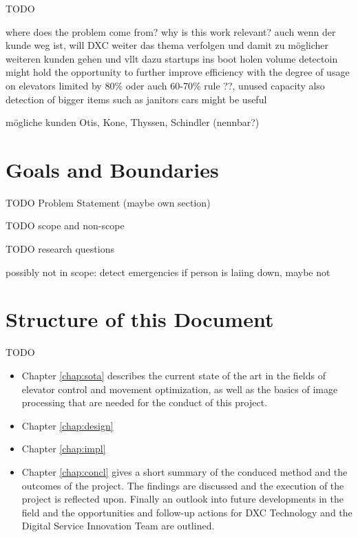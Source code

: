 TODO


where does the problem come from?
why is this work relevant?
auch wenn der kunde weg ist, will DXC weiter das thema verfolgen und damit zu möglicher weiteren kunden gehen und vllt dazu startups ins boot holen
volume detectoin might hold the opportunity to further improve efficiency with the degree of usage on elevators
limited by 80\% oder auch 60-70\% rule ??, unused capacity
also detection of bigger items such as janitors cars might be useful


mögliche kunden Otis, Kone, Thyssen, Schindler (nennbar?)

\section{Goals and Boundaries}

TODO Problem Statement (maybe own section)

TODO scope and non-scope

TODO research questions

possibly not in scope: detect emergencies if person is laiing down, maybe not


\section{Structure of this Document}

TODO

\begin{itemize}
    \item Chapter \ref{chap:sota} describes the current state of the art in the fields of elevator control and movement optimization, as well as the basics of image processing that are needed for the conduct of this project.
    \item Chapter \ref{chap:design} 
    \item Chapter \ref{chap:impl}
    \item Chapter \ref{chap:concl} gives a short summary of the conduced method and the outcomes of the project. The findings are discussed and the execution of the project is reflected upon. Finally an outlook into future developments in the field and the opportunities and follow-up actions for DXC Technology and the Digital Service Innovation Team are outlined.
\end{itemize}